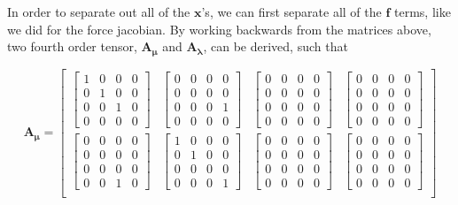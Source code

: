 \documentclass[twocolumn,10pt]{asme2ej}
\begin{document}
In order to separate out all of the $\bm{x}$'s, we can first separate all of the $\bm{f}$ terms, like we did for the force jacobian. By working backwards from the matrices above, two fourth order tensor, $\bm{A_{\mu}}$ and $\bm{A_{\lambda}}$, can be derived, such that

\begin{equation}
    \bm{A_{\mu}} = \begin{bmatrix}
    \begin{bmatrix} 1 & 0 & 0 & 0 \\ 0 & 1 & 0 & 0 \\ 0 & 0 & 1 & 0 \\ 0 & 0 & 0 & 0 \end{bmatrix} &
    \begin{bmatrix} 0 & 0 & 0 & 0 \\ 0 & 0 & 0 & 0 \\ 0 & 0 & 0 & 1 \\ 0 & 0 & 0 & 0 \end{bmatrix} &
    \begin{bmatrix} 0 & 0 & 0 & 0 \\ 0 & 0 & 0 & 0 \\ 0 & 0 & 0 & 0 \\ 0 & 0 & 0 & 0 \end{bmatrix} &
    \begin{bmatrix} 0 & 0 & 0 & 0 \\ 0 & 0 & 0 & 0 \\ 0 & 0 & 0 & 0 \\ 0 & 0 & 0 & 0 \end{bmatrix} \\
      \begin{bmatrix} 0 & 0 & 0 & 0 \\ 0 & 0 & 0 & 0 \\ 0 & 0 & 0 & 0 \\ 0 & 0 & 1 & 0 \end{bmatrix} &
      \begin{bmatrix} 1 & 0 & 0 & 0 \\ 0 & 1 & 0 & 0 \\ 0 & 0 & 0 & 0 \\ 0 & 0 & 0 & 1 \end{bmatrix} &
      \begin{bmatrix} 0 & 0 & 0 & 0 \\ 0 & 0 & 0 & 0 \\ 0 & 0 & 0 & 0 \\ 0 & 0 & 0 & 0 \end{bmatrix} &
      \begin{bmatrix} 0 & 0 & 0 & 0 \\ 0 & 0 & 0 & 0 \\ 0 & 0 & 0 & 0 \\ 0 & 0 & 0 & 0 \end{bmatrix} \\

\end{bmatrix}
\end{equation}
\end{document}
